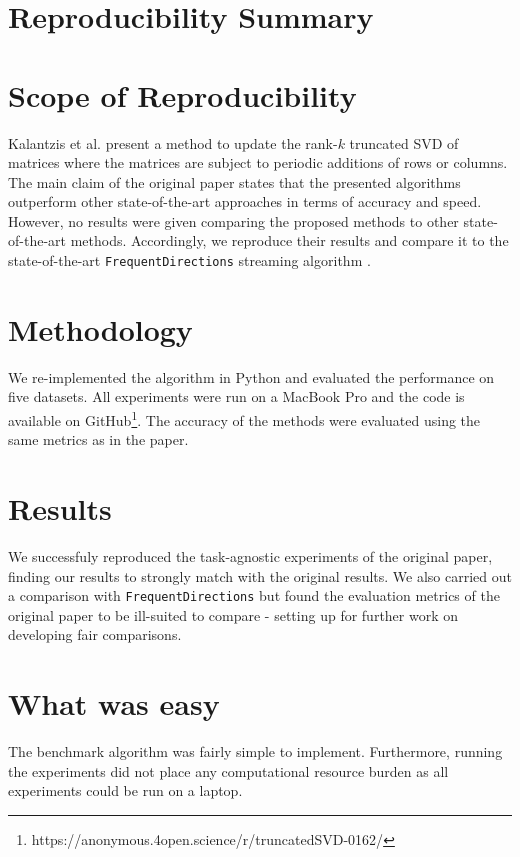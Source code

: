 \section*{\centering Reproducibility Summary} \label{sec:summary}

\section*{Scope of Reproducibility}

Kalantzis et al. \cite{Kalantzis2021} present a method to update the rank-$k$ truncated SVD of matrices where the matrices are subject to periodic additions of rows or columns. The main claim of the original paper states that the presented algorithms outperform other state-of-the-art approaches in terms of accuracy and speed. However, no results were given comparing the proposed methods to other state-of-the-art methods. Accordingly, we reproduce their results and compare it to the state-of-the-art \verb|FrequentDirections| streaming algorithm \cite{Ghashami2016}.

\section*{Methodology}

We re-implemented the algorithm in Python and evaluated the performance on five datasets. All experiments were run on a MacBook Pro and the code is available on GitHub\footnote{https://anonymous.4open.science/r/truncatedSVD-0162/}. The accuracy of the methods were evaluated using the same metrics as in the paper.

\section*{Results}

We successfuly reproduced the task-agnostic experiments of the original paper, finding our results to strongly match with the original results. We also carried out a comparison with \verb|FrequentDirections| but found the evaluation metrics of the original paper to be ill-suited to compare - setting up for further work on developing fair comparisons. 

\section*{What was easy}

The benchmark algorithm was fairly simple to implement. Furthermore, running the experiments did not place any computational resource burden as all experiments could be run on a laptop.

